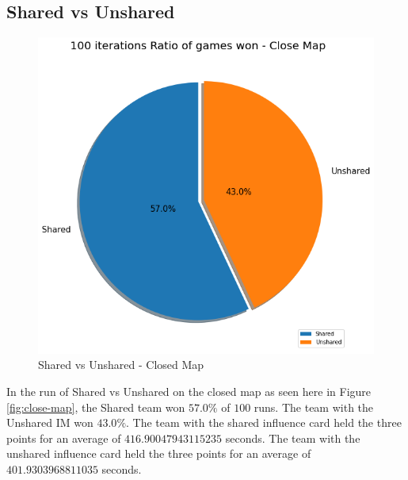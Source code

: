 \documentclass[]{report}
\begin{document}
		\subsection{Shared vs Unshared}
		\begin{figure}[h!]
			\centering
			\includegraphics[width=0.9\linewidth]{"Images/100 Games Shared vs Unshared Close Map"}
			\caption[Shared vs Unshared - Closed Map]{Shared vs Unshared - Closed Map}
			\label{fig:100-games-shared-vs-unshared-close-map}
		\end{figure}
		In the run of Shared vs Unshared on the closed map as seen here in Figure \ref{fig:close-map}, the Shared team won $57.0\%$ of $100$ runs. The team with the Unshared \ac{IM} won $43.0\%$. The team with the shared influence card held the three points for an average of $416.90047943115235$ seconds.
		The team with the unshared influence card held the three points for an average of $401.9303968811035$ seconds.
		
		
		\clearpage
\end{document}
